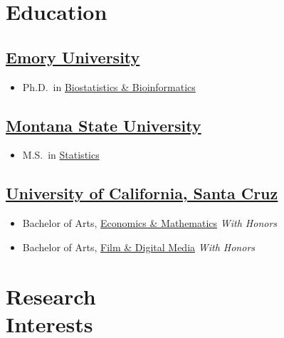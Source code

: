 \documentclass{wm_cv}
\begin{document}
\maketitle%

\section{Education}

\subsection{\href{https://www.emory.edu/home/index.html}{Emory University}} 
\vspace{-\parskip}%
\begin{itemize}[label={}]
    \item Ph.D.\ in \href{https://www.sph.emory.edu/departments/bios/degree-programs/phd/index.html}{Biostatistics \& Bioinformatics} 
\end{itemize}

\subsection{\href{https://www.montana.edu/}{Montana State University}} 
\vspace{-\parskip}%
\begin{itemize}[label={}]
  \item M.S.\ in \href{http://catalog.montana.edu/graduate/letters-science/mathematical-sciences/ms-statistics/}{Statistics} 
\end{itemize}

\subsection{\href{https://www.ucsc.edu/}{University of California, Santa Cruz}}
\vspace{-\parskip}%
\begin{itemize}[label={}]
  \item Bachelor of Arts, \href{https://economics.ucsc.edu/academics/undergraduate-program/majors-minor/econ-math.html}{Economics \& Mathematics} \emph{With Honors}
  \item Bachelor of Arts, \href{https://admissions.sa.ucsc.edu/majors/filmdigital}{Film \& Digital Media} \emph{With Honors}
\end{itemize}

\section{Research \\ Interests}
\end{document}
